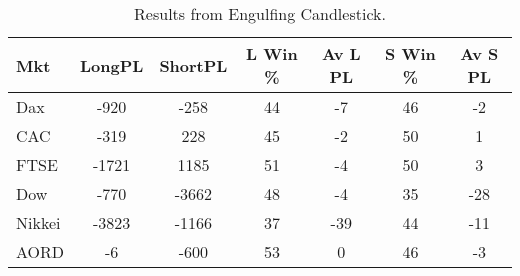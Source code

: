 \begin{table}[ht]
\centering
\caption[Engulfing Candlestick System]{Results from Engulfing Candlestick.} 
\label{tab:engulf_results}
\begin{tabular}{lcccccc}
  \toprule Mkt & LongPL & ShortPL & L Win \% & Av L PL & S Win \% & Av S PL \\ 
  \midrule Dax & -920 & -258 & 44 & -7 & 46 & -2 \\ 
  CAC & -319 & 228 & 45 & -2 & 50 & 1 \\ 
  FTSE & -1721 & 1185 & 51 & -4 & 50 & 3 \\ 
  Dow & -770 & -3662 & 48 & -4 & 35 & -28 \\ 
  Nikkei & -3823 & -1166 & 37 & -39 & 44 & -11 \\ 
  AORD & -6 & -600 & 53 & 0 & 46 & -3 \\ 
   \bottomrule \end{tabular}
\end{table}
